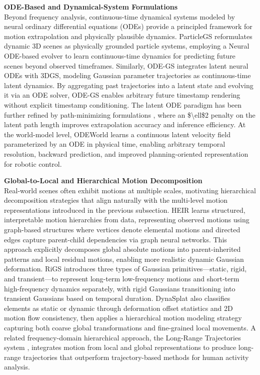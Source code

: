\documentclass[11pt]{article}
\begin{document}
\textbf{ODE-Based and Dynamical-System Formulations}\\
Beyond frequency analysis, continuous-time dynamical systems modeled by neural ordinary differential equations (ODEs) provide a principled framework for motion extrapolation and physically plausible dynamics. ParticleGS \cite{ref348} reformulates dynamic 3D scenes as physically grounded particle systems, employing a Neural ODE-based evolver to learn continuous-time dynamics for predicting future scenes beyond observed timeframes. Similarly, ODE-GS \cite{ref349} integrates latent neural ODEs with 3DGS, modeling Gaussian parameter trajectories as continuous-time latent dynamics. By aggregating past trajectories into a latent state and evolving it via an ODE solver, ODE-GS enables arbitrary future timestamp rendering without explicit timestamp conditioning. The latent ODE paradigm has been further refined by path-minimizing formulations \cite{ref350}, where an \$\textbackslash ell\$2 penalty on the latent path length improves extrapolation accuracy and inference efficiency. At the world-model level, ODEWorld \cite{ref351} learns a continuous latent velocity field parameterized by an ODE in physical time, enabling arbitrary temporal resolution, backward prediction, and improved planning-oriented representation for robotic control.

\textbf{Global-to-Local and Hierarchical Motion Decomposition}\\
Real-world scenes often exhibit motions at multiple scales, motivating hierarchical decomposition strategies that align naturally with the multi-level motion representations introduced in the previous subsection. HEIR \cite{ref352} learns structured, interpretable motion hierarchies from data, representing observed motions using graph-based structures where vertices denote elemental motions and directed edges capture parent-child dependencies via graph neural networks. This approach explicitly decomposes global absolute motions into parent-inherited patterns and local residual motions, enabling more realistic dynamic Gaussian deformation. RiGS \cite{ref353} introduces three types of Gaussian primitives---static, rigid, and transient---to represent long-term low-frequency motions and short-term high-frequency dynamics separately, with rigid Gaussians transitioning into transient Gaussians based on temporal duration. DynaSplat \cite{ref354} also classifies elements as static or dynamic through deformation offset statistics and 2D motion flow consistency, then applies a hierarchical motion modeling strategy capturing both coarse global transformations and fine-grained local movements. A related frequency-domain hierarchical approach, the Long-Range Trajectories system \cite{ref355}, integrates motion from local and global representations to produce long-range trajectories that outperform trajectory-based methods for human activity analysis.
\end{document}
